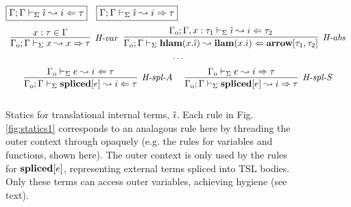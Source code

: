 \begin{figure}[t]
$\fbox{$\Gamma; \Gamma \vdash_\Sigma \hat{\imath} \leadsto i \Leftarrow \tau$}$~
$\fbox{$\Gamma; \Gamma \vdash_\Sigma \hat{\imath} \leadsto i \Rightarrow \tau$}$
\[
\begin{array}{c}
\infer[\textit{H-var}]
	{\Gout; \Gin \vdash_\Sigma x \leadsto x \Rightarrow\tau } 
	{x:\tau \in \Gin }
~~
\infer[\textit{H-abs}]
	{\Gout; \Gin \vdash_\Sigma  \keyw{hlam}(x . \ih) \leadsto \keyw{ilam}(x.i) \Leftarrow \keyw{arrow}[\tau_1,  \tau_2] } 
	{\Gout; \Gin, x:\tau_1 \vdash_\Sigma \hat{\imath}\leadsto i\Leftarrow \tau_2 }\\[1ex]
\cdots\\[1ex]
\infer[\textit{H-spl-A}]
	{\Gout; \Gin \vdash_\Sigma \keyw{spliced}[e] \leadsto i \Leftarrow \tau}
	{\Gout \vdash_\Sigma e \leadsto i \Leftarrow \tau}~~~~

\infer[\textit{H-spl-S}]
	{\Gout; \Gin \vdash_\Sigma \keyw{spliced}[e] \leadsto i \Rightarrow \tau}
	{\Gout \vdash_\Sigma e \leadsto i \Rightarrow \tau}\\[2ex]
\end{array}
\]
\vspace{-15px}
\caption{Statics for translational internal terms, $\hat{\imath}$. Each rule in Fig. \ref{fig:statics1} corresponds to an analagous rule here by threading the outer context through opaquely (e.g. the rules for variables and functions, shown here). The outer context is only used by the rules for $\textbf{spliced}[e]$, representing external terms spliced into TSL bodies. Only these terms can access outer variables, achieving hygiene (see text).}
\vspace{-10px}
\label{fig:staticsHat}
\end{figure}

